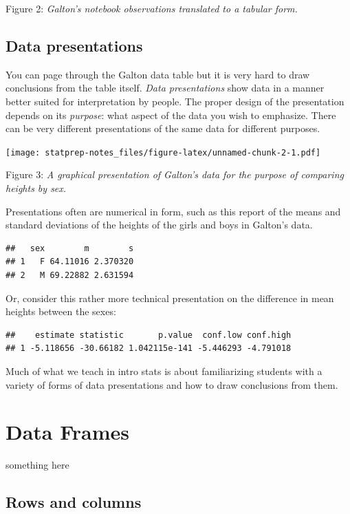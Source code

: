 \documentclass[]{book}
\theoremstyle{definition}
\theoremstyle{definition}
\theoremstyle{definition}
\theoremstyle{remark}
\begin{document}
\hypertarget{htmlwidget-0041afc6eb1e2aad9d36}{}

Figure 2: \emph{Galton's notebook observations translated to a tabular
form.}

\section{Data presentations}\label{data-presentations}

You can page through the Galton data table but it is very hard to draw
conclusions from the table itself. \emph{Data presentations} show data
in a manner better suited for interpretation by people. The proper
design of the presentation depends on its \emph{purpose}: what aspect of
the data you wish to emphasize. There can be very different
presentations of the same data for different purposes.

\texttt{[image: statprep-notes\_files/figure-latex/unnamed-chunk-2-1.pdf]}

Figure 3: \emph{A graphical presentation of Galton's data for the
purpose of comparing heights by sex.}

Presentations often are numerical in form, such as this report of the
means and standard deviations of the heights of the girls and boys in
Galton's data.

\begin{verbatim}
##   sex        m        s
## 1   F 64.11016 2.370320
## 2   M 69.22882 2.631594
\end{verbatim}

Or, consider this rather more technical presentation on the difference
in mean heights between the sexes:

\begin{verbatim}
##    estimate statistic       p.value  conf.low conf.high
## 1 -5.118656 -30.66182 1.042115e-141 -5.446293 -4.791018
\end{verbatim}

Much of what we teach in intro stats is about familiarizing students
with a variety of forms of data presentations and how to draw
conclusions from them.

\chapter{Data Frames}\label{data-frames}

something here

\section{Rows and columns}\label{rows-and-columns}
\end{document}
